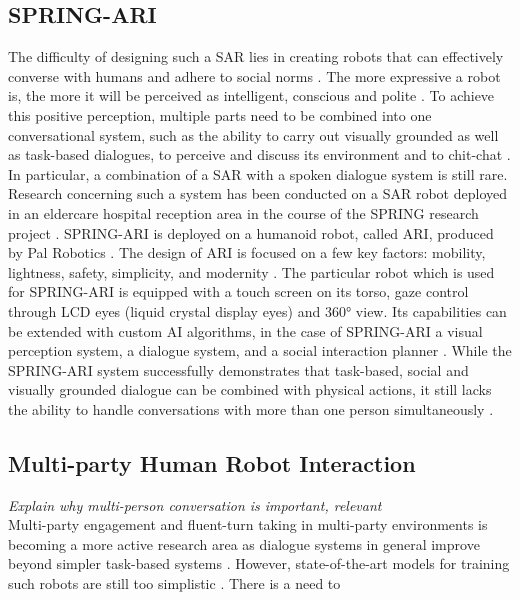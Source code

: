 \documentclass[11pt]{article}
\begin{document}
\subsection{SPRING-ARI}
\label{subsec:spring_ari}
The difficulty of designing such a SAR lies in creating robots that can effectively converse with humans and adhere to social norms \cite{moujahid_multi_party_2022}. The more expressive a robot is, the more it will be perceived as intelligent, conscious and polite \cite{moujahid_multi_party_2022}. To achieve this positive perception, multiple parts need to be combined into one conversational system, such as the ability to carry out visually grounded as well as task-based dialogues, to perceive and discuss its environment and to chit-chat \cite{gunson_visually_aware_2022}. In particular, a combination of a SAR with a spoken dialogue system is still rare. Research concerning such a system has been conducted on a SAR robot deployed in an eldercare hospital reception area in the course of the SPRING research project \cite{addlesee_comprehensive_2020}. SPRING-ARI is deployed on a humanoid robot, called ARI, produced by Pal Robotics \cite{palrobot}. The design of ARI is focused on a few key factors: mobility, lightness, safety, simplicity, and modernity \cite{cooper_ari_2020}. The particular robot which is used for SPRING-ARI is equipped with a touch screen on its torso, gaze control through LCD eyes (liquid crystal display eyes) and 360° view. Its capabilities can be extended with custom AI algorithms, in the case of SPRING-ARI a visual perception system, a dialogue system, and a social interaction planner \cite{addlesee_comprehensive_2020}. While the SPRING-ARI system successfully demonstrates that task-based, social and visually grounded dialogue can be combined with physical actions, it still lacks the ability to handle conversations with more than one person simultaneously \cite{addlesee_comprehensive_2020}. 

\subsection{Multi-party Human Robot Interaction}
\label{subsec:multi_party}
\textit{Explain why multi-person conversation is important, relevant} \\
Multi-party engagement and fluent-turn taking in multi-party environments is becoming a more active research area as dialogue systems in general improve beyond simpler task-based systems \cite{skantze_turn_taking_2021}. However, state-of-the-art models for training such robots are still too simplistic \cite{skantze_turn_taking_2021}. There is a need to 
\end{document}
